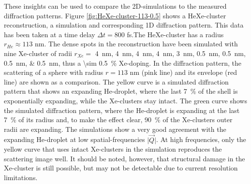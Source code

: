 These insights can be used to compare the 2D-simulations to the measured diffraction patterns. Figure \ref{fig:HeXe-cluster-113-0.5} shows a HeXe-cluster reconstruction, a simulation and corresponding 1D diffraction pattern. This data has been taken at a time delay $\Delta t=800$ fs.The HeXe-cluster has a radius $r_{He}\approx 113$ nm. The dense spots in the reconstruction have been simulated with nine Xe-cluster of radii $r_{Xe}=$ \SIlist{4;4;4;4;3;0.5;0.5;0.5;0.5}{\nano\meter}, thus a \SI{\sim 0.5}{\percent} Xe-doping. In the diffraction pattern, the scattering of a sphere with radius $r=113$ nm (pink line) and its envelope (red line) are shown as a comparison. The yellow curve is a simulated diffraction pattern that shows an expanding He-droplet, where the last \SI{7}{\percent} of the shell is exponentially expanding, while the Xe-clusters stay intact. The green curve shows the simulated diffraction pattern, where the He-droplet is expanding at the last \SI{7}{\percent} of its radius and, to make the effect clear, \SI{90}{\percent} of the Xe-clusters outer radii are expanding. The simulations show a very good agreement with the expanding He-droplet at low spatial-frequencies $\lvert\vec{Q}\rvert$. At high frequencies, only the yellow curve that uses intact Xe-clusters in the simulation reproduces the scattering image well. It should be noted, however, that structural damage in the Xe-cluster is still possible, but may not be detectable due to current resolution limitations.
%
%
%
